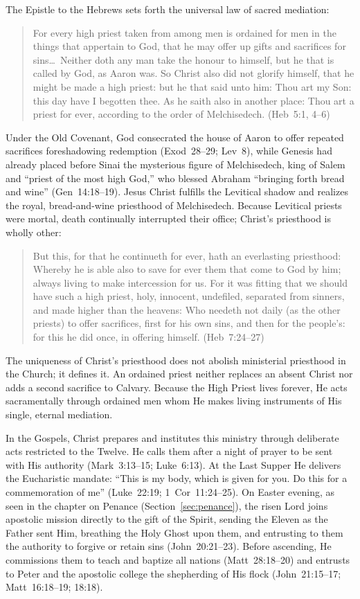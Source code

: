 The Epistle to the Hebrews sets forth the universal law of sacred mediation:
\begin{quotation}
For every high priest taken from among men is ordained for men in the things that appertain to God, that he may offer up gifts and sacrifices for sins\ldots\ Neither doth any man take the honour to himself, but he that is called by God, as Aaron was. So Christ also did not glorify himself, that he might be made a high priest: but he that said unto him: Thou art my Son: this day have I begotten thee. As he saith also in another place: Thou art a priest for ever, according to the order of Melchisedech. (Heb~5:1, 4--6)
\end{quotation}
Under the Old Covenant, God consecrated the house of Aaron to offer repeated sacrifices foreshadowing redemption (Exod~28--29; Lev~8), while Genesis had already placed before Sinai the mysterious figure of Melchisedech, king of Salem and ``priest of the most high God,'' who blessed Abraham ``bringing forth bread and wine'' (Gen~14:18--19). Jesus Christ fulfills the Levitical shadow and realizes the royal, bread-and-wine priesthood of Melchisedech. Because Levitical priests were mortal, death continually interrupted their office; Christ's priesthood is wholly other:
\begin{quotation}
But this, for that he continueth for ever, hath an everlasting priesthood: Whereby he is able also to save for ever them that come to God by him; always living to make intercession for us. For it was fitting that we should have such a high priest, holy, innocent, undefiled, separated from sinners, and made higher than the heavens: Who needeth not daily (as the other priests) to offer sacrifices, first for his own sins, and then for the people's: for this he did once, in offering himself. (Heb~7:24--27)
\end{quotation}
The uniqueness of Christ's priesthood does not abolish ministerial priesthood in the Church; it defines it. An ordained priest neither replaces an absent Christ nor adds a second sacrifice to Calvary. Because the High Priest lives forever, He acts sacramentally through ordained men whom He makes living instruments of His single, eternal mediation.

In the Gospels, Christ prepares and institutes this ministry through deliberate acts restricted to the Twelve. He calls them after a night of prayer to be sent with His authority (Mark~3:13--15; Luke~6:13). At the Last Supper He delivers the Eucharistic mandate: ``This is my body, which is given for you. Do this for a commemoration of me'' (Luke~22:19; 1~Cor~11:24--25). On Easter evening, as seen in the chapter on Penance (Section~\ref{sec:penance}), the risen Lord joins apostolic mission directly to the gift of the Spirit, sending the Eleven as the Father sent Him, breathing the Holy Ghost upon them, and entrusting to them the authority to forgive or retain sins (John~20:21--23). Before ascending, He commissions them to teach and baptize all nations (Matt~28:18--20) and entrusts to Peter and the apostolic college the shepherding of His flock (John~21:15--17; Matt~16:18--19; 18:18).

